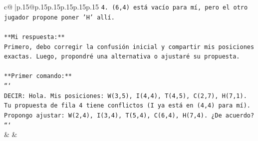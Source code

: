 \documentclass{article}
\begin{document}
{\begin{supertabular}{c@{$\;$}|p{.15\linewidth}@{}p{.15\linewidth}p{.15\linewidth}p{.15\linewidth}p{.15\linewidth}p{.15\linewidth}}
{{{\texttt{4. (6,4) está vacío para mí, pero el otro jugador propone poner 'H' allí.} \\
\\ 
\texttt{**Mi respuesta:**} \\
\texttt{Primero, debo corregir la confusión inicial y compartir mis posiciones exactas. Luego, propondré una alternativa o ajustaré su propuesta.} \\
\\ 
\texttt{**Primer comando:**} \\
\texttt{```} \\
\texttt{DECIR: Hola. Mis posiciones: W(3,5), I(4,4), T(4,5), C(2,7), H(7,1). Tu propuesta de fila 4 tiene conflictos (I ya está en (4,4) para mí). Propongo ajustar: W(2,4), I(3,4), T(5,4), C(6,4), H(7,4). ¿De acuerdo?} \\
\texttt{```} \\
            }
        }
    }
    & & \\ \\


\end{supertabular}}
\end{document}
